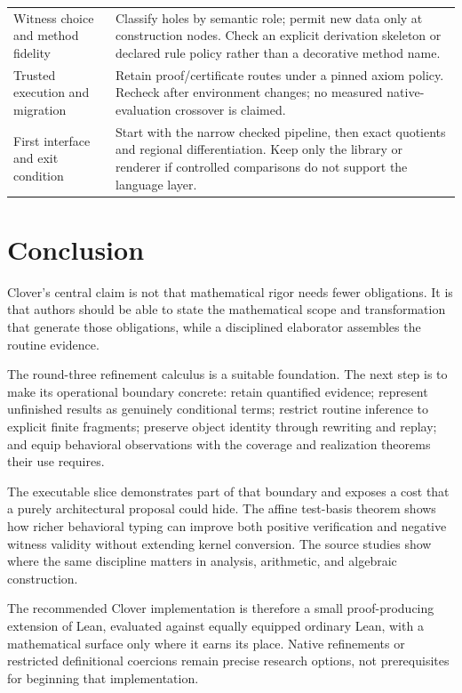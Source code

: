 \documentclass[11pt,a4paper]{article}
\theoremstyle{definition}
\theoremstyle{remark}
\begin{document}
\begin{center}
\begin{longtable}{@{}P{.28\textwidth}P{.63\textwidth}@{}}
Witness choice and method fidelity & Classify holes by semantic role; permit new data only at construction nodes. Check an explicit derivation skeleton or declared rule policy rather than a decorative method name.\\
Trusted execution and migration & Retain proof/certificate routes under a pinned axiom policy. Recheck after environment changes; no measured native-evaluation crossover is claimed.\\
First interface and exit condition & Start with the narrow checked pipeline, then exact quotients and regional differentiation. Keep only the library or renderer if controlled comparisons do not support the language layer.\\
\end{longtable}
\end{center}

\section{Conclusion}

Clover's central claim is not that mathematical rigor needs fewer obligations.
It is that authors should be able to state the mathematical scope and
transformation that generate those obligations, while a disciplined elaborator
assembles the routine evidence.

The round-three refinement calculus is a suitable foundation. The next step
is to make its operational boundary concrete: retain quantified evidence;
represent unfinished results as genuinely conditional terms; restrict routine
inference to explicit finite fragments; preserve object identity through
rewriting and replay; and equip behavioral observations with the coverage and
realization theorems their use requires.

The executable slice demonstrates part of that boundary and exposes a cost
that a purely architectural proposal could hide. The affine test-basis theorem
shows how richer behavioral typing can improve both positive verification and
negative witness validity without extending kernel conversion. The source
studies show where the same discipline matters in analysis, arithmetic, and
algebraic construction.

The recommended Clover implementation is therefore a small proof-producing
extension of Lean, evaluated against equally equipped ordinary Lean, with a
mathematical surface only where it earns its place. Native refinements or
restricted definitional coercions remain precise research options, not
prerequisites for beginning that implementation.
\end{document}

